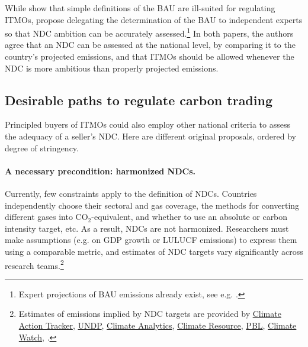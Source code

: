 \documentclass[12pt,english]{article}
\begin{document}

While \cite{la_hoz_theuer_when_2019} show that simple definitions of the BAU are ill-suited for regulating ITMOs, \cite{michaelowa_additionality_2019} propose delegating the determination of the BAU to independent experts so that NDC ambition can be accurately assessed.\footnote{Expert projections of BAU emissions already exist, see e.g. \cite{den_elzen_impact_2023,den_elzen_infographics_2024}.} In both papers, the authors agree that an NDC can be assessed at the national level, by comparing it to the country's projected emissions, and that ITMOs should be allowed whenever the NDC is more ambitious than properly projected emissions. 

\subsection{Desirable paths to regulate carbon trading\label{subsec:desirable}}

Principled %
buyers of ITMOs could also employ other national criteria to assess the adequacy of a seller's NDC. Here are different original proposals, ordered by degree of stringency.

\paragraph{A necessary precondition: harmonized NDCs.} %
Currently, few constraints apply to the definition of NDCs. Countries independently choose their sectoral and gas coverage, the methods for converting different gases into CO$_\text{2}$-equivalent, and whether to use an absolute or carbon intensity target, etc. As a result, NDCs are not harmonized. Researchers must make assumptions (e.g. on GDP growth or LULUCF emissions) to express them using a comparable metric, and estimates of NDC targets vary significantly across research teams.\footnote{Estimates of emissions implied by NDC targets are provided by \href{https://climateactiontracker.org/}{Climate Action Tracker}, \href{https://www.climateandforests-undp.org/plant}{UNDP}, \href{https://1p5ndc-pathways.climateanalytics.org/}{Climate Analytics}, \href{https://www.climate-resource.com/tools/ndcs}{Climate Resource}, \href{https://zenodo.org/records/10875617}{PBL}, \href{https://www.climatewatchdata.org/}{Climate Watch}, \cite{nascimento_comparing_2024,den_elzen_updated_2022}.} %
\end{document}
